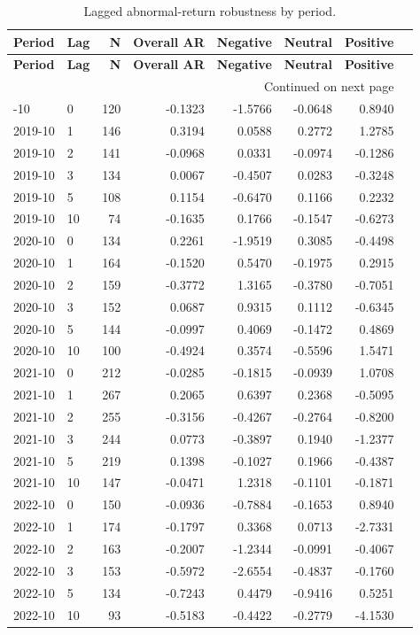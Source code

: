\begin{longtable}{llrrrrrr}
\caption{Lagged abnormal-return robustness by period.}\label{tab:lag-robustness-multi-year}\\
\toprule
\textbf{Period} & \textbf{Lag} & \textbf{N} & \textbf{Overall AR} & \textbf{Negative} & \textbf{Neutral} & \textbf{Positive} \\
\midrule
\endfirsthead
\toprule
\textbf{Period} & \textbf{Lag} & \textbf{N} & \textbf{Overall AR} & \textbf{Negative} & \textbf{Neutral} & \textbf{Positive} \\
\midrule
\endhead
\midrule
\multicolumn{7}{r}{Continued on next page}\\
\endfoot
\bottomrule
\endlastfoot
2019-10 & 0 & 120 & -0.1323 & -1.5766 & -0.0648 & 0.8940 \\
2019-10 & 1 & 146 & 0.3194 & 0.0588 & 0.2772 & 1.2785 \\
2019-10 & 2 & 141 & -0.0968 & 0.0331 & -0.0974 & -0.1286 \\
2019-10 & 3 & 134 & 0.0067 & -0.4507 & 0.0283 & -0.3248 \\
2019-10 & 5 & 108 & 0.1154 & -0.6470 & 0.1166 & 0.2232 \\
2019-10 & 10 & 74 & -0.1635 & 0.1766 & -0.1547 & -0.6273 \\
2020-10 & 0 & 134 & 0.2261 & -1.9519 & 0.3085 & -0.4498 \\
2020-10 & 1 & 164 & -0.1520 & 0.5470 & -0.1975 & 0.2915 \\
2020-10 & 2 & 159 & -0.3772 & 1.3165 & -0.3780 & -0.7051 \\
2020-10 & 3 & 152 & 0.0687 & 0.9315 & 0.1112 & -0.6345 \\
2020-10 & 5 & 144 & -0.0997 & 0.4069 & -0.1472 & 0.4869 \\
2020-10 & 10 & 100 & -0.4924 & 0.3574 & -0.5596 & 1.5471 \\
2021-10 & 0 & 212 & -0.0285 & -0.1815 & -0.0939 & 1.0708 \\
2021-10 & 1 & 267 & 0.2065 & 0.6397 & 0.2368 & -0.5095 \\
2021-10 & 2 & 255 & -0.3156 & -0.4267 & -0.2764 & -0.8200 \\
2021-10 & 3 & 244 & 0.0773 & -0.3897 & 0.1940 & -1.2377 \\
2021-10 & 5 & 219 & 0.1398 & -0.1027 & 0.1966 & -0.4387 \\
2021-10 & 10 & 147 & -0.0471 & 1.2318 & -0.1101 & -0.1871 \\
2022-10 & 0 & 150 & -0.0936 & -0.7884 & -0.1653 & 0.8940 \\
2022-10 & 1 & 174 & -0.1797 & 0.3368 & 0.0713 & -2.7331 \\
2022-10 & 2 & 163 & -0.2007 & -1.2344 & -0.0991 & -0.4067 \\
2022-10 & 3 & 153 & -0.5972 & -2.6554 & -0.4837 & -0.1760 \\
2022-10 & 5 & 134 & -0.7243 & 0.4479 & -0.9416 & 0.5251 \\
2022-10 & 10 & 93 & -0.5183 & -0.4422 & -0.2779 & -4.1530 \\
\end{longtable}

